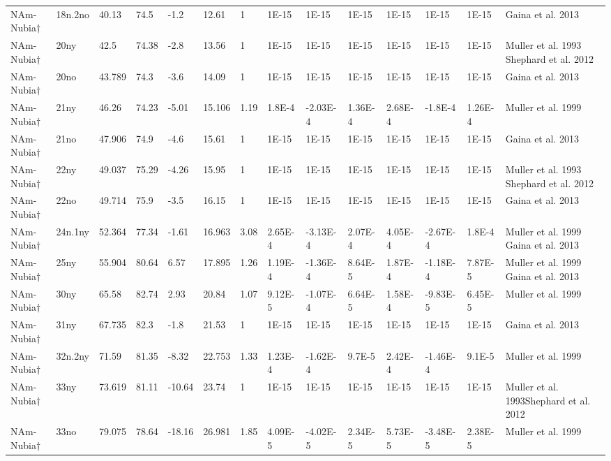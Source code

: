 \begin{landscape}
\begin{longtable}{@{}lllllllllllllp{3.5cm}@{}}
NAm-Nubia$\dagger$ & 18n.2no & 40.13 & 74.5 & -1.2 & 12.61 & 1 & 1E-15 & 1E-15 & 1E-15 & 1E-15 & 1E-15 & 1E-15 & Gaina et al. 2013 \\
NAm-Nubia$\dagger$ & 20ny & 42.5 & 74.38 & -2.8 & 13.56 & 1 & 1E-15 & 1E-15 & 1E-15 & 1E-15 & 1E-15 & 1E-15 & Muller et al. 1993 Shephard et al. 2012 \\
NAm-Nubia$\dagger$ & 20no & 43.789 & 74.3 & -3.6 & 14.09 & 1 & 1E-15 & 1E-15 & 1E-15 & 1E-15 & 1E-15 & 1E-15 & Gaina et al. 2013 \\
NAm-Nubia$\dagger$ & 21ny & 46.26 & 74.23 & -5.01 & 15.106 & 1.19 & 1.8E-4 & -2.03E-4 & 1.36E-4 & 2.68E-4 & -1.8E-4 & 1.26E-4 & Muller et al. 1999 \\
NAm-Nubia$\dagger$ & 21no & 47.906 & 74.9 & -4.6 & 15.61 & 1 & 1E-15 & 1E-15 & 1E-15 & 1E-15 & 1E-15 & 1E-15 & Gaina et al. 2013 \\
NAm-Nubia$\dagger$ & 22ny & 49.037 & 75.29 & -4.26 & 15.95 & 1 & 1E-15 & 1E-15 & 1E-15 & 1E-15 & 1E-15 & 1E-15 & Muller et al. 1993 Shephard et al. 2012 \\
NAm-Nubia$\dagger$ & 22no & 49.714 & 75.9 & -3.5 & 16.15 & 1 & 1E-15 & 1E-15 & 1E-15 & 1E-15 & 1E-15 & 1E-15 & Gaina et al. 2013 \\
NAm-Nubia$\dagger$ & 24n.1ny & 52.364 & 77.34 & -1.61 & 16.963 & 3.08 & 2.65E-4 & -3.13E-4 & 2.07E-4 & 4.05E-4 & -2.67E-4 & 1.8E-4 & Muller et al. 1999 Gaina et al. 2013 \\
NAm-Nubia$\dagger$ & 25ny & 55.904 & 80.64 & 6.57 & 17.895 & 1.26 & 1.19E-4 & -1.36E-4 & 8.64E-5 & 1.87E-4 & -1.18E-4 & 7.87E-5 & Muller et al. 1999 Gaina et al. 2013 \\
NAm-Nubia$\dagger$ & 30ny & 65.58 & 82.74 & 2.93 & 20.84 & 1.07 & 9.12E-5 & -1.07E-4 & 6.64E-5 & 1.58E-4 & -9.83E-5 & 6.45E-5 & Muller et al. 1999 \\
NAm-Nubia$\dagger$ & 31ny & 67.735 & 82.3 & -1.8 & 21.53 & 1 & 1E-15 & 1E-15 & 1E-15 & 1E-15 & 1E-15 & 1E-15 & Gaina et al. 2013 \\
NAm-Nubia$\dagger$ & 32n.2ny & 71.59 & 81.35 & -8.32 & 22.753 & 1.33 & 1.23E-4 & -1.62E-4 & 9.7E-5 & 2.42E-4 & -1.46E-4 & 9.1E-5 & Muller et al. 1999 \\
NAm-Nubia$\dagger$ & 33ny & 73.619 & 81.11 & -10.64 & 23.74 & 1 & 1E-15 & 1E-15 & 1E-15 & 1E-15 & 1E-15 & 1E-15 & Muller et al. 1993Shephard et al. 2012 \\
NAm-Nubia$\dagger$ & 33no & 79.075 & 78.64 & -18.16 & 26.981 & 1.85 & 4.09E-5 & -4.02E-5 & 2.34E-5 & 5.73E-5 & -3.48E-5 & 2.38E-5 & Muller et al. 1999 \\

\end{longtable}
\end{landscape}
